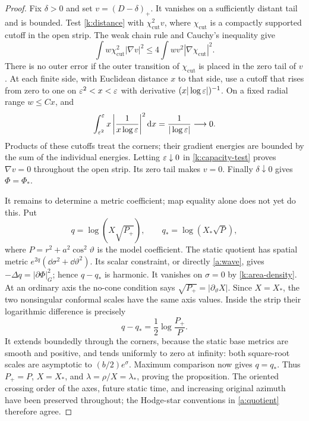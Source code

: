 \begin{proof}
Fix \(\delta>0\) and set \(v=(D-\delta)_+\).
It vanishes on a sufficiently distant tail and is bounded.
Test \eqref{k:distance} with \(\chi_{\mathrm{cut}}^2v\), where \(\chi_{\mathrm{cut}}\) is a
compactly supported cutoff in the open strip. The weak chain rule
and Cauchy's inequality give
\begin{equation}\label{k:capacity-test}
 \int w\chi_{\mathrm{cut}}^2|\nabla v|^2
       \le4\int wv^2|\nabla\chi_{\mathrm{cut}}|^2 .
\end{equation}
There is no outer error if the outer transition of \(\chi_{\mathrm{cut}}\) is
placed in the zero tail of \(v\). At each finite side, with
Euclidean distance \(x\) to that side, use a cutoff that rises
from zero to one on \(\varepsilon^2<x<\varepsilon\) with derivative
\((x|\log\varepsilon|)^{-1}\). On a fixed radial range \(w\le Cx\), and
\[
 \int_{\varepsilon^2}^{\varepsilon}
       x\left|\frac1{x\log\varepsilon}\right|^2\mathrm d x
          =\frac1{|\log\varepsilon|}\longrightarrow0.
\]
Products of these cutoffs treat the corners; their gradient
energies are bounded by the sum of the individual energies.
Letting \(\varepsilon\downarrow0\) in \eqref{k:capacity-test} proves
\(\nabla v=0\) throughout the open strip. Its zero tail makes
\(v=0\). Finally \(\delta\downarrow0\) gives
\(\Phi=\Phi_*\).

It remains to determine a metric coefficient; map equality alone
does not yet do this. Put
\[
 q=\log(X\sqrt{P_+}),\qquad q_*=\log(X_*\sqrt P),
\]
where \(P=r^2+a^2\cos^2\vartheta\) is the model coefficient.
The static quotient has spatial metric
\(e^{2q}(\dd\sigma^2+\dd\vartheta^2)\). Its scalar constraint,
or directly \eqref{a:wave}, gives
\(-\Delta q=|\partial\Phi|_G^2\); hence \(q-q_*\) is harmonic.
It vanishes on \(\sigma=0\) by \eqref{k:area-density}.
At an ordinary axis the no-cone condition says
\(\sqrt{P_+}=|\partial_\vartheta X|\). Since \(X=X_*\),
the two nonsingular conformal scales have the same axis values.
Inside the strip their logarithmic difference is precisely
\[
 q-q_*=\frac12\log\frac{P_+}{P}.
\]
It extends boundedly through the corners, because the static
base metrics are smooth and positive, and tends uniformly to
zero at infinity: both square-root scales are asymptotic to
\((b/2)e^\sigma\). Maximum comparison now gives \(q=q_*\).
Thus \(P_+=P\), \(X=X_*\), and
\(\lambda=\rho/X=\lambda_*\), proving the proposition.
The oriented crossing order of the axes, future static time,
and increasing original azimuth have been preserved throughout;
the Hodge-star conventions in \eqref{a:quotient} therefore agree.
\end{proof}

